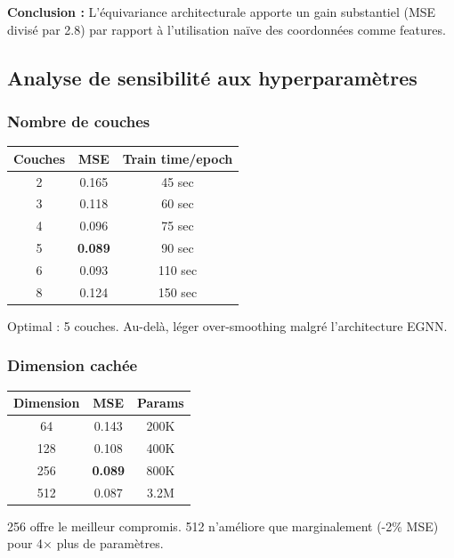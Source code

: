 \textbf{Conclusion :}
L'équivariance architecturale apporte un gain substantiel (MSE divisé par 2.8) par rapport à l'utilisation naïve des coordonnées comme features.

\subsection{Analyse de sensibilité aux hyperparamètres}

\subsubsection{Nombre de couches}

\begin{center}
\begin{tabular}{|c|c|c|}
\hline
\textbf{Couches} & \textbf{MSE} & \textbf{Train time/epoch} \\
\hline
2 & 0.165 & 45 sec \\
3 & 0.118 & 60 sec \\
4 & 0.096 & 75 sec \\
5 & \textbf{0.089} & 90 sec \\
6 & 0.093 & 110 sec \\
8 & 0.124 & 150 sec \\
\hline
\end{tabular}
\end{center}

Optimal : 5 couches. Au-delà, léger over-smoothing malgré l'architecture EGNN.

\subsubsection{Dimension cachée}

\begin{center}
\begin{tabular}{|c|c|c|}
\hline
\textbf{Dimension} & \textbf{MSE} & \textbf{Params} \\
\hline
64 & 0.143 & 200K \\
128 & 0.108 & 400K \\
256 & \textbf{0.089} & 800K \\
512 & 0.087 & 3.2M \\
\hline
\end{tabular}
\end{center}

256 offre le meilleur compromis. 512 n'améliore que marginalement (-2\% MSE) pour 4× plus de paramètres.

